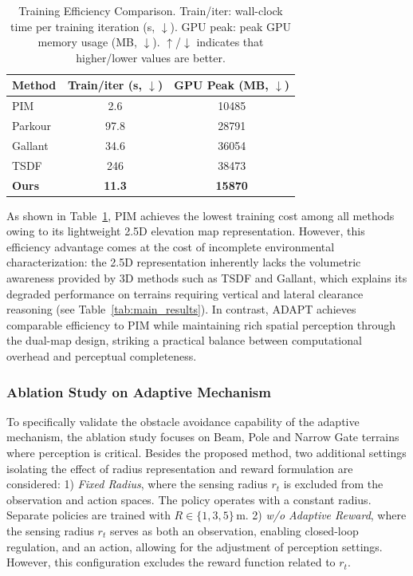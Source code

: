 \begin{table}[t]
\centering
\caption{Training Efficiency Comparison. Train/iter: wall-clock time per training iteration (s, $\downarrow$). GPU peak: peak GPU memory usage (MB, $\downarrow$). $\uparrow$/$\downarrow$ indicates that higher/lower values are better.}
\label{tab:efficiency}
\setlength{\tabcolsep}{6pt}
\begin{center}
\begin{tabular}{lcc}
\toprule[1.0pt]
Method & Train/iter (s, $\downarrow$) & GPU Peak (MB, $\downarrow$) \\
\midrule[0.8pt]
PIM~\cite{long2025learning} & 2.6 & 10485 \\[0.4ex]
Parkour~\cite{zhuang2024humanoid} & 97.8 & 28791 \\[0.4ex]
Gallant~\cite{Ben_2025_Gallant}   & 34.6 & 36054 \\[0.4ex]
TSDF                                     & 246 & 38473 \\[0.4ex]
\textbf{Ours}                     & \textbf{11.3} & \textbf{15870} \\
\bottomrule[1.0pt]
\end{tabular}
\end{center}
\end{table}

As shown in Table~\ref{tab:efficiency}, PIM achieves the lowest training cost among all methods owing to its lightweight 2.5D elevation map representation. However, this efficiency advantage comes at the cost of incomplete environmental characterization: the 2.5D representation inherently lacks the volumetric awareness provided by 3D methods such as TSDF and Gallant, which explains its degraded performance on terrains requiring vertical and lateral clearance reasoning (see Table~\ref{tab:main_results}). In contrast, ADAPT achieves comparable efficiency to PIM while maintaining rich spatial perception through the dual-map design, striking a practical balance between computational overhead and perceptual completeness.

\subsubsection{Ablation Study on Adaptive Mechanism}
To specifically validate the obstacle avoidance capability of the adaptive mechanism, the ablation study focuses on Beam, Pole and Narrow Gate terrains where perception is critical. 
Besides the proposed method, two additional settings isolating the effect of radius representation and reward formulation are considered:
1) \textit{Fixed Radius}, where the sensing radius $r_t$ is excluded from the observation and action spaces. The policy operates with a constant radius. Separate policies are trained with $R \in \{1, 3, 5\}$\,m.
2) \textit{w/o Adaptive Reward}, where the sensing radius $r_t$ serves as both an observation, enabling closed-loop regulation, and an action, allowing for the adjustment of perception settings. However, this configuration excludes the reward function related to $r_t$.

